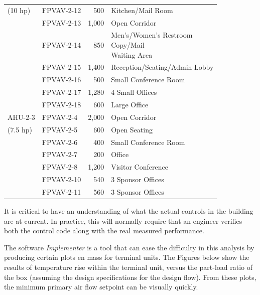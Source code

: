 \begin{table}[]
\begin{tabular}{@{}llrl@{}}
(10 hp)           & FPVAV-2-12 & 500   & Kitchen/Mail Room                        \\ \cmidrule(r){2-4}
                  & FPVAV-2-13 & 1,000 & Open Corridor                            \\ \cmidrule(r){2-4}
                  & FPVAV-2-14 & 850   & \pbox{\textwidth}{Men's/Women's Restroom \\ Copy/Mail         \\ Waiting Area } \\ \cmidrule(r){2-4}
                  & FPVAV-2-15 & 1,400 & Reception/Seating/Admin Lobby            \\ \cmidrule(r){2-4}
                  & FPVAV-2-16 & 500   & Small Conference Room                    \\ \cmidrule(r){2-4}
                  & FPVAV-2-17 & 1,280 & 4 Small Offices                          \\ \cmidrule(r){2-4}
                  & FPVAV-2-18 & 600   & Large Office                             \\ \midrule
AHU-2-3           & FPVAV-2-4  & 2,000 & Open Corridor                            \\ \cmidrule(r){2-4}
(7.5 hp)          & FPVAV-2-5  & 600   & Open Seating                             \\ \cmidrule(r){2-4}
                  & FPVAV-2-6  & 400   & Small Conference Room                    \\ \cmidrule(r){2-4}
                  & FPVAV-2-7  & 200   & Office                                   \\ \cmidrule(r){2-4}
                  & FPVAV-2-8  & 1,200 & Visitor Conference                       \\ \cmidrule(r){2-4}
                  & FPVAV-2-10 & 540   & 3 Sponsor Offices                        \\ \cmidrule(r){2-4}
                  & FPVAV-2-11 & 560   & 3 Sponsor Offices                        \\ \bottomrule
\end{tabular}
\end{table}

It is critical to have an understanding of what the actual controls in
the building are at current. In practice, this will normally require
that an engineer verifies both the control code along with the real
measured performance.

The software \textit{Implementer} is a tool that can ease the difficulty
in this analysis by producing certain plots en mass for terminal units.
The Figures below show the results of temperature rise within the
terminal unit, versus the part-load ratio of the box (assuming the
design specifications for the design flow). From these plots, the
minimum primary air flow setpoint can be visually quickly.

